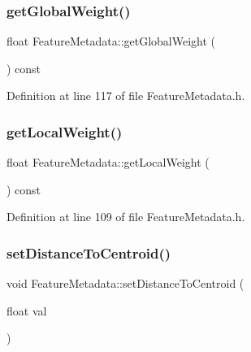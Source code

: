 \subsubsection{\texorpdfstring{get\+Global\+Weight()}{getGlobalWeight()}}
{\footnotesize\ttfamily float Feature\+Metadata\+::get\+Global\+Weight (\begin{DoxyParamCaption}{ }\end{DoxyParamCaption}) const\hspace{0.3cm}{\ttfamily [inline]}}



Definition at line 117 of file Feature\+Metadata.\+h.

\mbox{\label{class_feature_metadata_a03bdbfab84fa2b98930093657d40735c}} 
\subsubsection{\texorpdfstring{get\+Local\+Weight()}{getLocalWeight()}}
{\footnotesize\ttfamily float Feature\+Metadata\+::get\+Local\+Weight (\begin{DoxyParamCaption}{ }\end{DoxyParamCaption}) const\hspace{0.3cm}{\ttfamily [inline]}}



Definition at line 109 of file Feature\+Metadata.\+h.

\mbox{\label{class_feature_metadata_abd9ec7695ed8e497aa1101695d3b5143}} 
\subsubsection{\texorpdfstring{set\+Distance\+To\+Centroid()}{setDistanceToCentroid()}}
{\footnotesize\ttfamily void Feature\+Metadata\+::set\+Distance\+To\+Centroid (\begin{DoxyParamCaption}\item[{float}]{val }\end{DoxyParamCaption})\hspace{0.3cm}{\ttfamily [inline]}}

